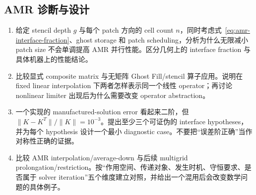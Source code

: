 \subsection*{AMR 诊断与设计}
\begin{enumerate}[label=\arabic*.]
\item 给定 stencil depth $g$ 与每个 patch 方向的 cell count $n$，同时考虑式~\eqref{eq:amr-interface-fraction}、ghost storage 和 patch scheduling，分析为什么无限减小 patch size 不会单调提高 AMR 并行性能。区分几何上的 interface fraction 与具体机器上的性能结论。
\item 比较显式 composite matrix 与无矩阵 Ghost Fill/stencil 算子应用。说明在 fixed linear interpolation 下两者怎样表示同一个线性 operator；再讨论 nonlinear limiter 出现后为什么需要改变 operator abstraction。
\item 一个实现的 manufactured-solution error 看起来二阶，但 $\|K-K^T\|/\|K\|=10^{-3}$。提出至少三个可证伪的 interface hypotheses，并为每个 hypothesis 设计一个最小 diagnostic case。不要把“误差阶正确”当作对称性正确的证据。
\item 比较 AMR interpolation/average-down 与后续 multigrid prolongation/restriction。按“作用空间、传递对象、发生时机、守恒要求、是否属于 solver iteration”五个维度建立对照，并给出一个混用后会改变数学问题的具体例子。
\end{enumerate}
